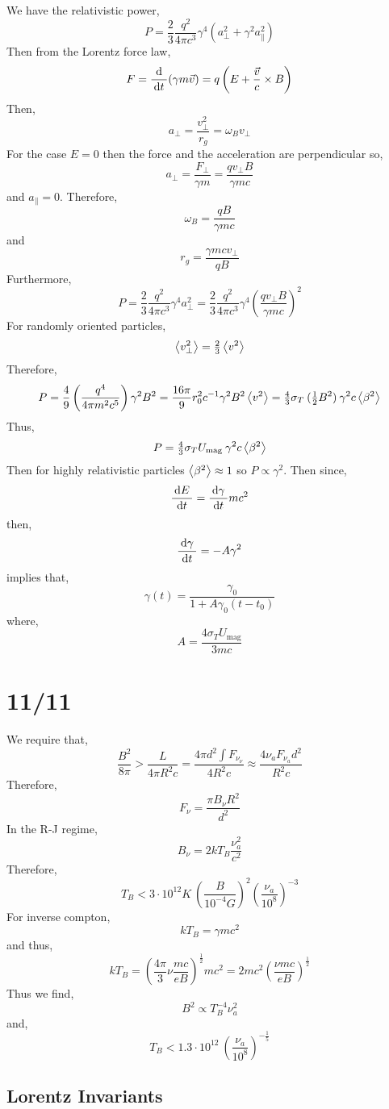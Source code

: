 \documentclass[11pt, a4paper]{article}
\begin{document}
We have the relativistic power,
\[ P = \frac{2}{3} \frac{q^2}{4 \pi c^3} \gamma^4 ( a_\perp^2 + \gamma^2 a_{\parallel}^2) \]
Then from the Lorentz force law,
\[ F = \frac{\: \mathrm{d} \:}{\: \mathrm{d}t \:} (\gamma m \vec{v}) = q \left( E + \frac{\vec{v}}{c} \times B \right) \]
Then,
\[ a_\perp = \frac{v_\perp^2}{r_g} = \omega_B v_\perp \]
For the case $E = 0$ then the force and the acceleration are perpendicular so,
\[ a_\perp = \frac{F_\perp}{\gamma m} = \frac{q v_\perp B}{\gamma m c} \]
and $a_\parallel = 0$. Therefore, 
\[ \omega_B = \frac{q B}{\gamma m c} \]
and 
\[ r_g = \frac{\gamma m c v_\perp}{q B} \]
Furthermore,
\[ P = \frac{2}{3} \frac{q^2}{4 \pi c^3} \gamma^4 a_\perp^2 = \frac{2}{3} \frac{q^2}{4 \pi c^3} \gamma^4 \left( \frac{q v_\perp B}{\gamma m c} \right)^2 \] 
For randomly oriented particles,
\[ \left< v_\perp^2 \right> = \tfrac{2}{3} \left< v^2 \right> \]
Therefore,
\[ P = \frac{4}{9} \left( \frac{q^4}{4 \pi m^2 c^5} \right) \gamma^2 B^2 = \frac{16 \pi}{9} r_0^2 c^{-1} \gamma^2 B^2 \left< v^2 \right> = \tfrac{4}{3} \sigma_T \: (\tfrac{1}{2} B^2) \:  \gamma^2 c \left< \beta^2 \right>  \]
Thus,
\[ P = \tfrac{4}{3} \sigma_T U_{\text{mag}} \: \gamma^2 c \left< \beta^2 \right>  \]
Then for highly relativistic particles $\left< \beta^2 \right> \approx 1$ so $P \propto \gamma^2$. Then since,
\[ \frac{\: \mathrm{d}E \:}{\: \mathrm{d}t \:} = \frac{\: \mathrm{d}\gamma \:}{\: \mathrm{d}t \:} m c^2 \]
then,
\[ \frac{\: \mathrm{d}\gamma \:}{\: \mathrm{d}t \:} = - A \gamma^{2} \]
implies that,
\[ \gamma(t) = \frac{\gamma_0}{1 + A \gamma_0 (t - t_0)} \]
where,
\[ A = \frac{4 \sigma_T U_{\text{mag}} }{3 mc} \]

\section{11/11}

We require that,
\[ \frac{B^2}{8 \pi} > \frac{L}{4 \pi R^2 c}  = \frac{4 \pi d^2 \int F_{\nu_{\nu}}}{4 R^2 c} \approx \frac{4 \nu_a F_{\nu_a} d^2}{R^2 c} \]
Therefore,
\[ F_{\nu} = \frac{\pi B_\nu R^2}{d^2} \]
In the R-J regime,
\[ B_\nu = 2 k T_B \frac{\nu_a^2}{c^2} \]
Therefore,
\[ T_B < 3 \cdot 10^{12} K \: \left( \frac{B}{10^{-4} G} \right)^2 \left( \frac{\nu_a}{10^8} \right)^{-3} \]
For inverse compton,
\[ k T_B = \gamma m c^2 \]
and thus, 
\[ k T_B = \left( \frac{4 \pi}{3} \nu \frac{m c}{e B} \right)^{\frac{1}{2}} m c^2 = 2 m c^2 \left( \frac{\nu m c}{e B} \right)^{\frac{1}{2}} \]
Thus we find,
\[ B^2 \propto T_B^{-4} \nu_a^2 \]
and,
\[ T_B < 1.3 \cdot 10^{12} \: \left( \frac{\nu_a}{10^8} \right)^{-\frac{1}{5}} \]

\subsection{Lorentz Invariants}
\end{document}

